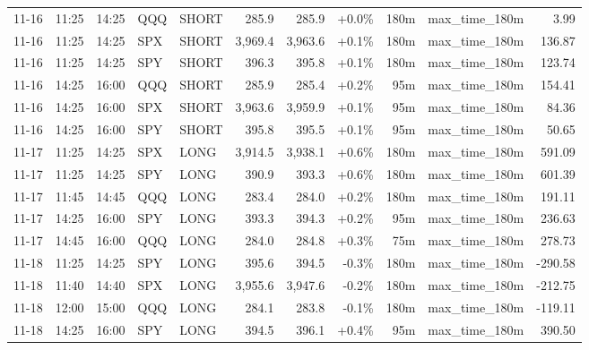 \documentclass[11pt,a4paper,twoside]{article}
\begin{document}
\begin{center}
\begin{longtable}{>{\color{txtmain}}l l l l l r r r r >{\color{txtmain}}l r}
11-16 & 11:25 & 14:25 & QQQ & SHORT & 285.9 & 285.9 & \textcolor{wingreen}{+0.0\%} & 180m & max\_time\_180m & \textcolor{wingreen}{3.99} \\
11-16 & 11:25 & 14:25 & SPX & SHORT & 3,969.4 & 3,963.6 & \textcolor{wingreen}{+0.1\%} & 180m & max\_time\_180m & \textcolor{wingreen}{136.87} \\
11-16 & 11:25 & 14:25 & SPY & SHORT & 396.3 & 395.8 & \textcolor{wingreen}{+0.1\%} & 180m & max\_time\_180m & \textcolor{wingreen}{123.74} \\
11-16 & 14:25 & 16:00 & QQQ & SHORT & 285.9 & 285.4 & \textcolor{wingreen}{+0.2\%} & 95m & max\_time\_180m & \textcolor{wingreen}{154.41} \\
11-16 & 14:25 & 16:00 & SPX & SHORT & 3,963.6 & 3,959.9 & \textcolor{wingreen}{+0.1\%} & 95m & max\_time\_180m & \textcolor{wingreen}{84.36} \\
11-16 & 14:25 & 16:00 & SPY & SHORT & 395.8 & 395.5 & \textcolor{wingreen}{+0.1\%} & 95m & max\_time\_180m & \textcolor{wingreen}{50.65} \\
11-17 & 11:25 & 14:25 & SPX & LONG & 3,914.5 & 3,938.1 & \textcolor{wingreen}{+0.6\%} & 180m & max\_time\_180m & \textcolor{wingreen}{591.09} \\
11-17 & 11:25 & 14:25 & SPY & LONG & 390.9 & 393.3 & \textcolor{wingreen}{+0.6\%} & 180m & max\_time\_180m & \textcolor{wingreen}{601.39} \\
11-17 & 11:45 & 14:45 & QQQ & LONG & 283.4 & 284.0 & \textcolor{wingreen}{+0.2\%} & 180m & max\_time\_180m & \textcolor{wingreen}{191.11} \\
11-17 & 14:25 & 16:00 & SPY & LONG & 393.3 & 394.3 & \textcolor{wingreen}{+0.2\%} & 95m & max\_time\_180m & \textcolor{wingreen}{236.63} \\
11-17 & 14:45 & 16:00 & QQQ & LONG & 284.0 & 284.8 & \textcolor{wingreen}{+0.3\%} & 75m & max\_time\_180m & \textcolor{wingreen}{278.73} \\
11-18 & 11:25 & 14:25 & SPY & LONG & 395.6 & 394.5 & \textcolor{lossred}{-0.3\%} & 180m & max\_time\_180m & \textcolor{lossred}{-290.58} \\
11-18 & 11:40 & 14:40 & SPX & LONG & 3,955.6 & 3,947.6 & \textcolor{lossred}{-0.2\%} & 180m & max\_time\_180m & \textcolor{lossred}{-212.75} \\
11-18 & 12:00 & 15:00 & QQQ & LONG & 284.1 & 283.8 & \textcolor{lossred}{-0.1\%} & 180m & max\_time\_180m & \textcolor{lossred}{-119.11} \\
11-18 & 14:25 & 16:00 & SPY & LONG & 394.5 & 396.1 & \textcolor{wingreen}{+0.4\%} & 95m & max\_time\_180m & \textcolor{wingreen}{390.50} \\

\end{longtable}
\end{center}
\end{document}
